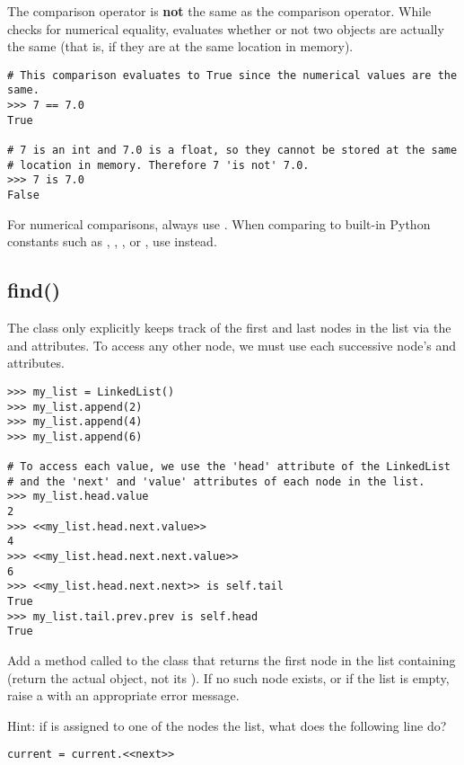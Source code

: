 \begin{warn}
The  comparison operator is \textbf{not} the same as the \li{==} comparison operator.
While \li{==} checks for numerical equality,  evaluates whether or not two objects are actually the same (that is, if they are at the same location in memory).

\begin{lstlisting}
# This comparison evaluates to True since the numerical values are the same.
>>> 7 == 7.0
True

# 7 is an int and 7.0 is a float, so they cannot be stored at the same
# location in memory. Therefore 7 'is not' 7.0.
>>> 7 is 7.0
False 
\end{lstlisting}

For numerical comparisons, always use \li{==}.
When comparing to built-in Python constants such as , , , or , use  instead.
\end{warn}

\subsection*{find()}

The  class only explicitly keeps track of the first and last nodes in the list via the  and  attributes.
To access any other node, we must use each successive node's  and  attributes.

\begin{lstlisting}
>>> my_list = LinkedList()
>>> my_list.append(2)
>>> my_list.append(4)
>>> my_list.append(6)

# To access each value, we use the 'head' attribute of the LinkedList
# and the 'next' and 'value' attributes of each node in the list.
>>> my_list.head.value
2
>>> <<my_list.head.next.value>>
4
>>> <<my_list.head.next.next.value>>
6
>>> <<my_list.head.next.next>> is self.tail
True
>>> my_list.tail.prev.prev is self.head
True
\end{lstlisting}

\begin{problem}
Add a method called  to the  class that
returns the first node in the list containing  (return the actual  object, not its ).
If no such node exists, or if the list is empty, raise a  with an appropriate error message.

Hint: if  is assigned to one of the nodes the list, what does the following line do?
\begin{lstlisting}
current = current.<<next>>
\end{lstlisting}
\end{problem}

